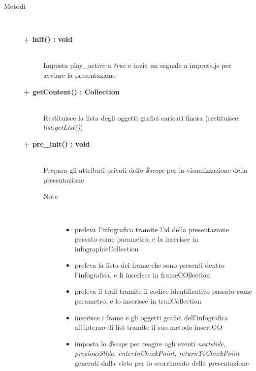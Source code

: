 \begin{description}
	
\item[Metodi] \hfill \\

	\begin{description}
		\item[\textbf{\color{blue}+ init() : void			}] \hfill \\
			Imposta play\_active a \textit{true} e invia un segnale a impress.js per avviare la presentazione
			
	\end{description}
	
	\begin{description}
		\item[\textbf{\color{blue}+ getContent() : Collection			}] \hfill \\
			Restituisce la lista degli oggetti grafici caricati finora (restituisce \textit{list.getList()})
			
	\end{description}
	
	\begin{description}
		\item[\textbf{\color{blue}+ pre\_init() : void			}] \hfill \\
			Prepara gli attributi privati dello \textit{\$scope} per la visualizzazione della presentazione
			
		\begin{description}
			\item[Note] \hfill \\
			\begin{itemize}
					\item preleva l'infografica tramite l'id della presentazione passato come parametro, e la inserisce in infographicCollection
					\item preleva la lista dei frame che sono presenti dentro l'infografica, e li inserisce in frameCOllection
					\item preleva il trail tramite il codice identificativo passato come parametro, e lo inserisce in trailCollection
					\item inserisce i frame e gli oggetti grafici dell'infografica all'interno di list tramite il suo metodo insertGO
					\item imposta lo \textit{\$scope} per reagire agli eventi \textit{nextslide, previousSlide, enterInCheckPoint, returnToCheckPoint} generati dalla vista per lo scorrimento della presentazione
			\end{itemize}
		\end{description}
	\end{description}

\end{description}










